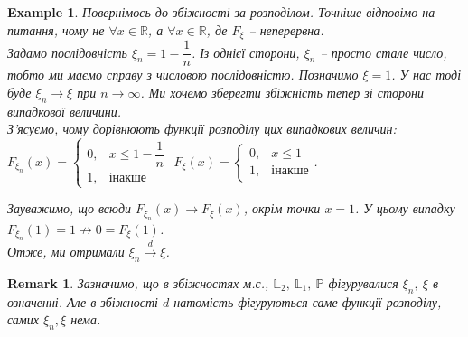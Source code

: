 \documentclass[a4paper, 10pt]{article}
\theoremstyle{theoremdd}
\newtheorem{example}[theorem]{Example}
\newtheorem{remark}[theorem]{Remark}
\newcommand{\todistribution}{\overset{d}{\to}}
\begin{document}
\begin{example}
Повернімось до збіжності за розподілом. Точніше відповімо на питання, чому не $\forall x \in \mathbb{R}$, а $\forall x \in \mathbb{R}$, де $F_\xi$ -- неперервна.\\
Задамо послідовність $\xi_n = 1 - \dfrac{1}{n}$. Із однієї сторони, $\xi_n$ -- просто стале число, тобто ми маємо справу з числовою послідовністю. Позначимо $\xi = 1$. У нас тоді буде $\xi_n \to \xi$ при $n \to \infty$. Ми хочемо зберегти збіжність тепер зі сторони випадкової величини.\\
З'ясуємо, чому дорівнюють функції розподілу цих випадкових величин:\\
$F_{\xi_n}(x) = \begin{cases} 0, & x \leq 1 - \dfrac{1}{n} \\ 1, & \text{інакше} \end{cases}$ \qquad $F_{\xi}(x) = \begin{cases} 0, & x \leq 1 \\ 1, & \text{інакше} \end{cases}$.
\begin{figure}[H]
\centering
{}
\qquad
{}
\end{figure}
\noindent
Зауважимо, що всюди $F_{\xi_n}(x) \to F_{\xi}(x)$, окрім точки $x = 1$. У цьому випадку $F_{\xi_n}(1) = 1 \not\to 0 = F_\xi(1)$.\\
Отже, ми отримали $\xi_n \todistribution \xi$.
\end{example}

\begin{remark}
Зазначимо, що в збіжностях м.с., $\mathbb{L}_2,\ \mathbb{L}_1,\ \mathbb{P}$ фігурувалися $\xi_n,\ \xi$ в означенні. Але в збіжності $d$ натомість фігуруються саме функції розподілу, самих $\xi_n,\xi$ нема.
\end{remark}
\end{document}
